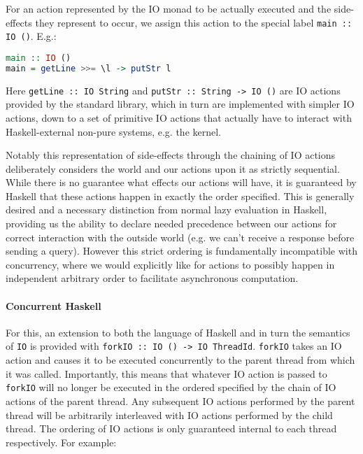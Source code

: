 \documentclass[a4paper,UKenglish,cleveref, autoref, thm-restate]{lipics-v2021}
\begin{document}
For an action represented by the IO monad to be actually executed and the side-effects they represent to occur, we assign this action to the special label \lstinline{main :: IO ()}. E.g.:

\begin{minipage}{\linewidth}
\begin{lstlisting}[language=Haskell,caption={The main function in Haskell},captionpos=t]
main :: IO ()
main = getLine >>= \l -> putStr l
\end{lstlisting}
\end{minipage}

Here \lstinline{getLine :: IO String} and \lstinline{putStr :: String -> IO ()} are IO actions provided by the standard library, which in turn are implemented with simpler IO actions, down to a set of primitive IO actions that actually have to interact with Haskell-external non-pure systems, e.g. the kernel.

Notably this representation of side-effects through the chaining of IO actions deliberately considers the world and our actions upon it as strictly sequential. While there is no guarantee what effects our actions will have, it is guaranteed by Haskell that these actions happen in exactly the order specified. This is generally desired and a necessary distinction from normal lazy evaluation in Haskell, providing us the ability to declare needed precedence between our actions for correct interaction with the outside world (e.g. we can't receive a response before sending a query). However this strict ordering is fundamentally incompatible with concurrency, where we would explicitly like for actions to possibly happen in independent arbitrary order to facilitate asynchronous computation.

\paragraph*{Concurrent Haskell}

For this, an extension to both the language of Haskell and in turn the semantics of \lstinline{IO} is provided with \lstinline{forkIO :: IO () -> IO ThreadId}\cite{jones1996concurrent}. \lstinline{forkIO} takes an IO action and causes it to be executed concurrently to the parent thread from which it was called. Importantly, this means that whatever IO action is passed to \lstinline{forkIO} will no longer be executed in the ordered specified by the chain of IO actions of the parent thread. Any subsequent IO actions performed by the parent thread will be arbitrarily interleaved with IO actions performed by the child thread. The ordering of IO actions is only guaranteed internal to each thread respectively. For example:
\end{document}

